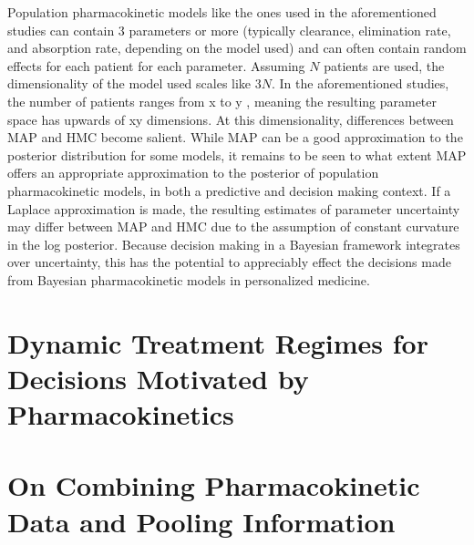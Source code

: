 Population pharmacokinetic models like the ones used in the aforementioned studies \needscite can contain 3 parameters or more (typically clearance, elimination rate, and absorption rate, depending on the model used) and can often contain random effects for each patient for each parameter.  Assuming $N$ patients are used, the dimensionality of the model used scales like $3N$.  In the aforementioned studies, the number of patients ranges from x to y \needscite, meaning the resulting parameter space has upwards of xy dimensions.  At this dimensionality, differences between MAP and HMC become salient. While MAP can be a good approximation to the posterior distribution for some models, it remains to be seen to what extent MAP offers an appropriate approximation to the posterior of population pharmacokinetic models, in both a predictive and decision making context.  If a Laplace approximation is made, the resulting estimates of parameter uncertainty may differ between MAP and HMC due to the assumption of constant curvature in the log posterior.  Because decision making in a Bayesian framework integrates over uncertainty, this has the potential to appreciably effect the decisions made from Bayesian pharmacokinetic models in personalized medicine.

\section{Dynamic Treatment Regimes for Decisions Motivated by Pharmacokinetics}

\section{On Combining Pharmacokinetic Data and Pooling Information}